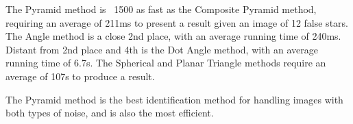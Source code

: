 The Pyramid method is ~1500 as fast as the Composite Pyramid method, requiring an average of 211ms to present a result
given an image of 12 false stars.
The Angle method is a close 2nd place, with an average running time of 240ms.
Distant from 2nd place and 4th is the Dot Angle method, with an average running time of 6.7s.
The Spherical and Planar Triangle methods require an average of 107s to produce a result.

The Pyramid method is the best identification method for handling images with both types of noise, and is also the
most efficient.

\begin{figure}
\end{figure}
